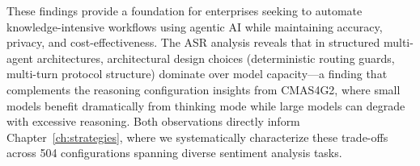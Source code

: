 These findings provide a foundation for enterprises seeking to automate knowledge-intensive workflows using agentic AI while maintaining accuracy, privacy, and cost-effectiveness. The ASR analysis reveals that in structured multi-agent architectures, architectural design choices (deterministic routing guards, multi-turn protocol structure) dominate over model capacity---a finding that complements the reasoning configuration insights from CMAS4G2, where small models benefit dramatically from thinking mode while large models can degrade with excessive reasoning. Both observations directly inform Chapter~\ref{ch:strategies}, where we systematically characterize these trade-offs across 504 configurations spanning diverse sentiment analysis tasks.
